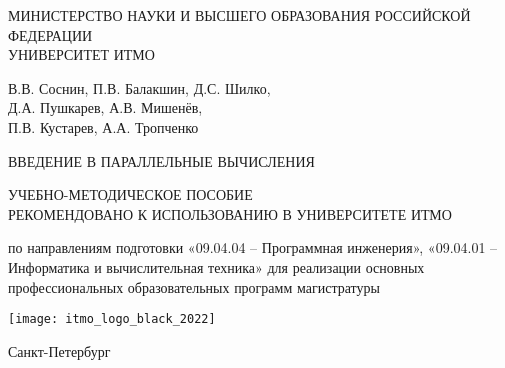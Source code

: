\thispagestyle{empty}

\begin{center}
    \noindent МИНИСТЕРСТВО НАУКИ И ВЫСШЕГО ОБРАЗОВАНИЯ РОССИЙСКОЙ ФЕДЕРАЦИИ
    \\[\baselineskip]
    УНИВЕРСИТЕТ ИТМО
    \\[2\baselineskip]
    \begin{bfseries}
        \begin{Large}
            В.В. Соснин, П.В. Балакшин, Д.С. Шилко, \\
            Д.А. Пушкарев, А.В. Мишенёв, \\
            П.В. Кустарев, А.А. Тропченко 
            \\[\baselineskip]
            \centerline{ВВЕДЕНИЕ В ПАРАЛЛЕЛЬНЫЕ ВЫЧИСЛЕНИЯ}
        \end{Large}
    \end{bfseries}
    
    \bigskip
    
    УЧЕБНО-МЕТОДИЧЕСКОЕ ПОСОБИЕ
    \\[\baselineskip]
    РЕКОМЕНДОВАНО К ИСПОЛЬЗОВАНИЮ В УНИВЕРСИТЕТЕ ИТМО
        
    по направлениям подготовки «09.04.04 -- Программная инженерия», «09.04.01 -- Информатика и вычислительная техника» для реализации основных профессиональных образовательных программ магистратуры

    \vspace{\fill}

    \texttt{[image: itmo\_logo\_black\_2022]}

    \bigskip

    \begin{bfseries}
        \begin{large}
            Санкт-Петербург \\ 
            \the\year
        \end{large}
    \end{bfseries}
    
\end{center}

        
